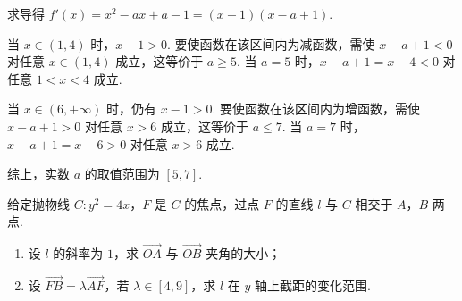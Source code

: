 \begin{solution}
求导得 \(f'(x)=x^2-ax+a-1=(x-1)(x-a+1)\).

当 \(x\in(1,4)\) 时，\(x-1>0\). 要使函数在该区间内为减函数，需使 \(x-a+1<0\) 对任意 \(x\in(1,4)\) 成立，这等价于 \(a\geqslant5\). 当 \(a=5\) 时，\(x-a+1=x-4<0\) 对任意 \(1<x<4\) 成立.

当 \(x\in(6,+\infty)\) 时，仍有 \(x-1>0\). 要使函数在该区间内为增函数，需使 \(x-a+1>0\) 对任意 \(x>6\) 成立，这等价于 \(a\leqslant7\). 当 \(a=7\) 时，\(x-a+1=x-6>0\) 对任意 \(x>6\) 成立.

综上，实数 \(a\) 的取值范围为 \([5,7]\).
\end{solution}

\begin{problem}
给定抛物线 \(C:y^2=4x\)，\(F\) 是 \(C\) 的焦点，过点 \(F\) 的直线 \(l\) 与 \(C\) 相交于 \(A\)，\(B\) 两点.

\begin{enumerate}
\item 设 \(l\) 的斜率为 \(1\)，求 \(\overrightarrow{OA}\) 与 \(\overrightarrow{OB}\) 夹角的大小；
\item 设 \(\overrightarrow{FB}=\lambda\overrightarrow{AF}\)，若 \(\lambda\in[4,9]\)，求 \(l\) 在 \(y\) 轴上截距的变化范围.
\end{enumerate}
\end{problem}

